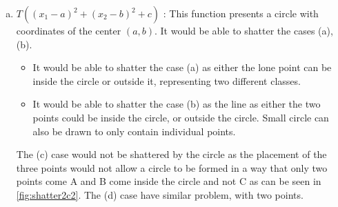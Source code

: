 \documentclass[a4paper, 11pt]{article}
\begin{document}
\begin{enumerate}[(a)]
\item \(T((x_1 - a)^2 + (x_2 - b)^2 + c)\) : This function presents a circle with coordinates of the center \((a,b)\). It would be able to shatter the cases (a), (b). 
\begin{itemize}
\item It would be able to shatter the case (a) as either the lone point can be inside the circle or outside it, representing two different classes.
\item It would be able to shatter the case (b) as the line as either the two points could be inside the circle, or outside the circle. Small circle can also be drawn to only contain individual points.
\end{itemize}
The (c) case would not be shattered by the circle as the placement of the three points would not allow a circle to be formed in a way that only two points come A and B come inside the circle and not C as can be seen in \autoref{fig:shatter2c2}. The (d) case have similar problem, with two points.
\begin{figure}
\centering
{}
\end{figure}
\end{enumerate}
\end{document}
